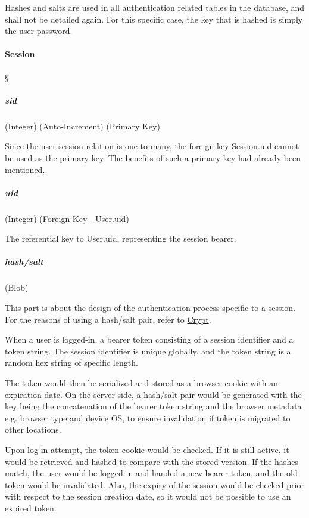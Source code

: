 Hashes and salts are used in all authentication related tables in the database,
and shall not be detailed again. For this specific case, the key that is hashed
is simply the user password.

\paragraph{Session}
\S{} \label{data-layer.design.user.tables.sess}

\subparagraph{sid}
(Integer) (Auto-Increment) (Primary Key)
\label{data-layer.design.user.tables.sess.sid}

Since the user-session relation is one-to-many, the foreign key Session.uid
cannot be used as the primary key. The benefits of such a primary key had already
been mentioned.

\subparagraph{uid}
(Integer) (Foreign Key - \hyperref[data-layer.design.user.tables.user.uid]{User.uid})
\label{data-layer.design.user.tables.sess.uid}

The referential key to User.uid, representing the session bearer.

\subparagraph{hash/salt}
(Blob) \label{data-layer.design.user.tables.sess.crypt}

This part is about the design of the authentication process specific to a
session. For the reasons of using a hash/salt pair, refer to
\hyperref[data-layer.design.user.tables.pswd.crypt]{Crypt}.

When a user is logged-in, a bearer token consisting of a session identifier and a
token string. The session identifier is unique globally, and the token string is
a random hex string of specific length.

The token would then be serialized and stored as a browser cookie with an expiration
date. On the server side, a hash/salt pair would be generated with the key being
the concatenation of the bearer token string and the browser metadata e.g.
browser type and device OS, to ensure invalidation if token is migrated to other
locations.

Upon log-in attempt, the token cookie would be checked. If it is still active,
it would be retrieved and hashed to compare with the stored version. If the hashes
match, the user would be logged-in and handed a new bearer token, and the old token
would be invalidated. Also, the expiry of the session would be checked prior with
respect to the session creation date, so it would not be possible to use an
expired token.

